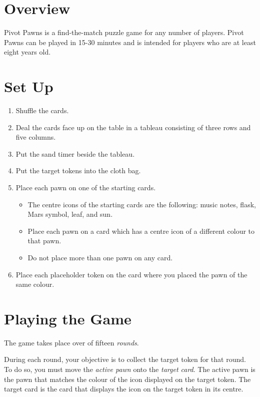 \documentclass[a6paper, parskip=half, DIV=14, 10pt]{scrartcl}
\begin{document}
\newpage

\section*{Overview}
Pivot Pawns is a find-the-match puzzle game for any number of players. Pivot Pawns can be played in 15-30 minutes and is intended for players who are at least eight years old.

\section*{Set Up}
\begin{enumerate}[leftmargin=*]
	\item Shuffle the cards.
	\item Deal the cards face up on the table in a tableau consisting of three rows and five columns.
	\item Put the sand timer beside the tableau.
	\item Put the target tokens into the cloth bag.
	\item Place each pawn on one of the starting cards.
	\begin{itemize}[leftmargin=*]
	  \item The centre icons of the starting cards are the following: music notes, flask, Mars symbol, leaf, and sun.
	  \item Place each pawn on a card which has a centre icon of a different colour to that pawn.
	  \item Do not place more than one pawn on any card.
	\end{itemize}
	\item Place each placeholder token on the card where you placed the pawn of the same colour.
\end{enumerate}

\newpage

\section*{Playing the Game}
The game takes place over of fifteen \emph{rounds}.

During each round, your objective is to collect the target token for that round. To do so, you must move the \emph{active pawn} onto the \emph{target card}. The active pawn is the pawn that matches the colour of the icon displayed on the target token. The target card is the card that displays the icon on the target token in its centre.
\end{document}
